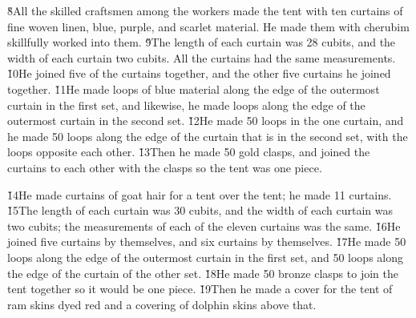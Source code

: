 \v{8}All the skilled craftsmen among the workers made the tent with ten curtains of fine woven linen, blue, purple, and scarlet material. He made them with cherubim skillfully worked into them. \v{9}The length of each curtain was 28 cubits, and the width of each curtain two cubits. All the curtains had the same measurements. \v{10}He joined five of the curtains together, and the other five curtains he joined together. \v{11}He made loops of blue material along the edge of the outermost curtain in the first set, and likewise, he made loops along the edge of the outermost curtain in the second set. \v{12}He made 50 loops in the one curtain, and he made 50 loops along the edge of the curtain that is in the second set, with the loops opposite each other. \v{13}Then he made 50 gold clasps, and joined the curtains to each other with the clasps so the tent was one piece.

\v{14}He made curtains of goat hair for a tent over the tent; he made 11 curtains. \v{15}The length of each curtain was 30 cubits, and the width of each curtain was two cubits; the measurements of each of the eleven curtains was the same. \v{16}He joined five curtains by themselves, and six curtains by themselves. \v{17}He made 50 loops along the edge of the outermost curtain in the first set, and 50 loops along the edge of the curtain of the other set. \v{18}He made 50 bronze clasps to join the tent together so it would be one piece. \v{19}Then he made a cover for the tent of ram skins dyed red and a covering of dolphin skins above that.

